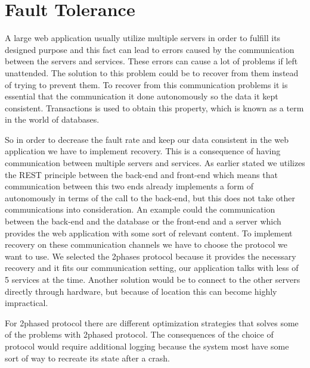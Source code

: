 \section{Fault Tolerance}
A large web application usually utilize multiple servers in order to fulfill its designed purpose and this fact can lead to errors caused by the communication between the servers and services. These errors can cause a lot of problems if left unattended. The solution to this problem could be to recover from them instead of trying to prevent them. To recover from this communication problems it is essential that the communication it done autonomously so the data it kept consistent. Transactions is used to obtain this property, which is known as a term in the world of databases.

So in order to decrease the fault rate and keep our data consistent in the web application we have to implement recovery. This is a consequence of having communication between multiple servers and services. As earlier stated we utilizes the REST principle between the back-end and front-end which means that communication between this two ends already implements a form of autonomously in terms of the call to the back-end, but this does not take other communications into consideration. An example could the communication between the back-end and the database or the front-end and a server which provides the web application with some sort of relevant content. To implement recovery on these communication channels we have to choose the protocol we want to use. We selected the 2phases protocol because it provides the necessary recovery and it fits our communication setting, our application talks with less of 5 services at the time. Another solution would be to connect to the other servers directly through hardware, but because of location this can become highly impractical.

For 2phased protocol there are different optimization strategies that solves some of the problems with 2phased protocol. The consequences of the choice of protocol would require additional logging because the system most have some sort of way to recreate its state after a crash.